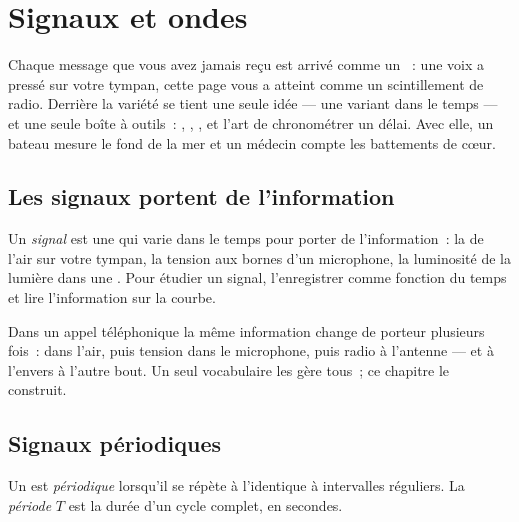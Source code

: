 \chapter{Signaux et ondes}\label{ch:g10:signals-and-waves}

Chaque message que vous avez jamais reçu est arrivé comme un
~: une voix a pressé sur votre tympan, cette page vous a
atteint comme un scintillement de radio. Derrière la variété se tient
une seule idée --- une  variant dans le temps
--- et une seule boîte à outils~: ,
, , et l'art de
chronométrer un délai. Avec elle, un bateau mesure le fond de la mer et
un médecin compte les battements de cœur.

\section{Les signaux portent de l'information}

\begin{definition}[Signal]\label{def:g10:signals-and-waves:signal}
Un \emph{signal} est une  qui
varie dans le temps pour porter de l'information~: la
 de l'air sur votre tympan, la tension aux
bornes d'un microphone, la luminosité de la lumière dans une
. Pour étudier un signal, l'enregistrer
comme fonction du temps et lire l'information sur la courbe.
\end{definition}

Dans un appel téléphonique la même information change de porteur
plusieurs fois~:  dans l'air, puis tension dans le
microphone, puis radio à l'antenne --- et à l'envers à l'autre bout. Un
seul vocabulaire les gère tous~; ce chapitre le construit.

\section{Signaux périodiques}

\begin{definition}\label{def:g10:signals-and-waves:period}
Un  est \emph{périodique}
lorsqu'il se répète à l'identique à intervalles réguliers. La
\emph{période} $T$ est la durée d'un cycle complet, en
secondes.
\end{definition}

